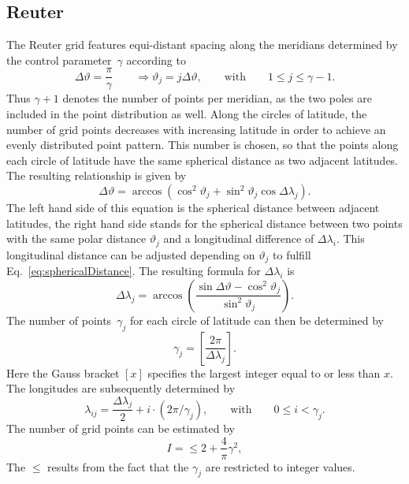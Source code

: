 \subsection{Reuter}
The Reuter grid features equi-distant spacing along the meridians determined
by the control parameter~$\gamma$ according to
\begin{equation}
\Delta\vartheta=\frac{\pi}{\gamma}\qquad\Rightarrow\vartheta_j=j\Delta\vartheta,\qquad\mbox{with}\qquad 1\leq j\leq \gamma-1.
\end{equation}
Thus $\gamma+1$ denotes the number of points per meridian, as the two poles
are included in the point distribution as well. Along the circles of latitude,
the number of grid points decreases with increasing latitude in order to achieve
an evenly distributed point pattern. This number is chosen, so that the points
along each circle of latitude have the same spherical distance as two adjacent
latitudes. The resulting relationship is given by
\begin{equation}\label{eq:sphericalDistance}
\Delta\vartheta=\arccos\left( \cos^2\vartheta_j+\sin^2\vartheta_j\cos\Delta\lambda_j\right).
\end{equation}
The left hand side of this equation is the spherical distance between adjacent
latitudes, the right hand side stands for the spherical distance between two points
with the same polar distance $\vartheta_j$ and a longitudinal difference of
$\Delta\lambda_i$. This longitudinal distance can be adjusted depending on
$\vartheta_j$ to fulfill Eq.~\eqref{eq:sphericalDistance}. The resulting
formula for $\Delta\lambda_i$ is
\begin{equation}\label{eq:deltaLambdai}
\Delta\lambda_j=\arccos\left( \frac{\sin\Delta\vartheta -\cos^2\vartheta_j}{\sin^2\vartheta_j}\right).
\end{equation}
The number of points~$\gamma_j$ for each circle of latitude can then be determined by
\begin{equation}\label{eq:gammai}
\gamma_j=\left[ \frac{2\pi}{\Delta\lambda_j}\right] .
\end{equation}
Here the Gauss bracket $[x]$ specifies the largest integer equal to or less than $x$.
The longitudes are subsequently determined by
\begin{equation}
\lambda_{ij}=\frac{\Delta\lambda_j}{2}+i\cdot(2\pi/\gamma_j),\qquad\mbox{with}\qquad 0\leq i< \gamma_j.
\end{equation}
The number of grid points can be estimated by
\begin{equation}\label{eq:numberReuter}
I=\leq 2+\frac{4}{\pi}\gamma^2,
\end{equation}
The $\leq$ results from the fact that the $\gamma_j$ are restricted to integer values.



